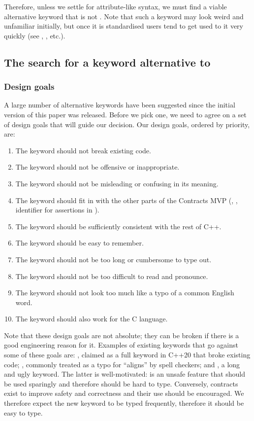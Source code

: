 Therefore, unless we settle for attribute-like syntax, we must find a viable alternative keyword that is not . Note that such a keyword may look weird and unfamiliar initially, but once it is standardised users tend to get used to it very quickly (see , , etc.).

\subsection{The search for a keyword alternative to }
\label{subsec:keyword}

\subsubsection{Design goals}
\label{subsubsec:keyword_goals}
A large number of alternative keywords have been suggested since the initial version of this paper was released. Before we pick one, we need to agree on a set of design goals that will guide our decision. Our design goals, ordered by priority, are:
\begin{enumerate}
\item The keyword should not break existing code.
\item The keyword should not be offensive or inappropriate.
\item The keyword should not be misleading or confusing in its meaning.
\item The keyword should fit in with the other parts of the Contracts MVP (, , identifier for assertions in \mbox{}).
\item The keyword should be sufficiently consistent with the rest of C++.
\item The keyword should be easy to remember.
\item The keyword should not be too long or cumbersome to type out.
\item The keyword should not be too difficult to read and pronounce.
\item The keyword should not look too much like a typo of a common English word.
\item The keyword should also work for the C language.
\end{enumerate}
Note that these design goals are not absolute; they can be broken if there is a good engineering reason for it. Examples of existing keywords that go against some of these goals are: , claimed as a full keyword in C++20 that broke existing code; , commonly treated as a typo for ``aligns'' by spell checkers; and , a long and ugly keyword. The latter is well-motivated: is an unsafe feature that should be used sparingly and therefore should be hard to type. Conversely, contracts exist to improve safety and correctness and their use should be encouraged. We therefore expect the new keyword to be typed frequently, therefore it should be easy to type.

